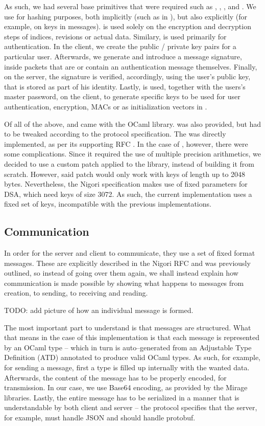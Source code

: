 As such, we had several base primitives that were required such as , , ,  and .
We use  for hashing purposes, both implicitly (such as in ), but also explicitly (for example, on  keys in messages).
 is used solely on the encryption and decryption steps of indices, revisions or actual data.
Similary,  is used primarily for authentication.
In the client, we create the public / private key pairs for a particular user.
Afterwards, we generate and introduce a message signature, inside packets that are or contain an authentication message themselves.
Finally, on the server, the signature is verified, accordingly, using the user's public key, that is stored as part of his identity.
Lastly,  is used, together with the users's master password, on the client, to generate specific keys to be used for user authentication, encryption, MACs or as initialization vectors in .

Of all of the above,  and  came with the OCaml  library.
 was also provided, but had to be tweaked according to the protocol specification.
The  was directly implemented, as per its supporting RFC \cite{RFC2898}.
In the case of , however, there were some complications.
Since it required the use of multiple precision arithmetics, we decided to use a custom patch applied to the  library, instead of building it from scratch.
However, said patch would only work with keys of length up to 2048 bytes.
Nevertheless, the Nigori specification makes use of fixed parameters for DSA, which need keys of size 3072.
As such, the current implementation uses a fixed set of keys, incompatible with the previous implementations.

\subsection{Communication}
In order for the server and client to communicate, they use a set of fixed format messages.
These are explicitly described in the Nigori RFC and was previously outlined, so instead of going over them again, we shall instead explain how communication is made possible by showing what happens to messages from creation, to sending, to receiving and reading.

TODO: add picture of how an individual message is formed.

The most important part to understand is that messages are structured.
What that means in the case of this implementation is that each message is represented by an OCaml type -- which in turn is auto--generated from an Adjustable Type Definition (ATD) annotated to produce valid OCaml types.
As such, for example, for sending a message, first a type is filled up internally with the wanted data.
Afterwards, the content of the message has to be properly encoded, for transmission.
In our case, we use Base64 encoding, as provided by the Mirage libraries.
Lastly, the entire message has to be serialized in a manner that is understandable by both client and server -- the protocol specifies that the server, for example, must handle JSON and should handle protobuf.

